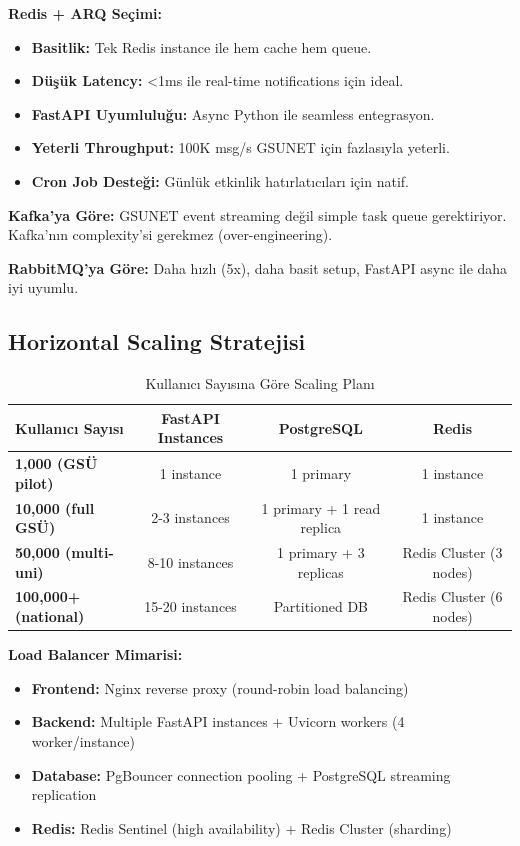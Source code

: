 \documentclass[a4paper,12pt]{report}
\begin{document}
\textbf{Redis + ARQ Seçimi:}

\begin{itemize}
    \item \textbf{Basitlik:} Tek Redis instance ile hem cache hem queue.
    \item \textbf{Düşük Latency:} <1ms ile real-time notifications için ideal.
    \item \textbf{FastAPI Uyumluluğu:} Async Python ile seamless entegrasyon.
    \item \textbf{Yeterli Throughput:} 100K msg/s GSUNET için fazlasıyla yeterli.
    \item \textbf{Cron Job Desteği:} Günlük etkinlik hatırlatıcıları için natif.
\end{itemize}

\textbf{Kafka'ya Göre:} GSUNET event streaming değil simple task queue gerektiriyor. Kafka'nın complexity'si gerekmez (over-engineering).

\textbf{RabbitMQ'ya Göre:} Daha hızlı (5x), daha basit setup, FastAPI async ile daha iyi uyumlu.

\subsection{Horizontal Scaling Stratejisi}

\begin{table}[h]
\centering
\small
\begin{tabular}{|l|c|c|c|}
\hline
\textbf{Kullanıcı Sayısı} & \textbf{FastAPI Instances} & \textbf{PostgreSQL} & \textbf{Redis} \\ \hline
\textbf{1,000 (GSÜ pilot)} & 1 instance & 1 primary & 1 instance \\ \hline
\textbf{10,000 (full GSÜ)} & 2-3 instances & 1 primary + 1 read replica & 1 instance \\ \hline
\textbf{50,000 (multi-uni)} & 8-10 instances & 1 primary + 3 replicas & Redis Cluster (3 nodes) \\ \hline
\textbf{100,000+ (national)} & 15-20 instances & Partitioned DB & Redis Cluster (6 nodes) \\ \hline
\end{tabular}
\caption{Kullanıcı Sayısına Göre Scaling Planı}
\end{table}

\textbf{Load Balancer Mimarisi:}

\begin{itemize}
    \item \textbf{Frontend:} Nginx reverse proxy (round-robin load balancing)
    \item \textbf{Backend:} Multiple FastAPI instances + Uvicorn workers (4 worker/instance)
    \item \textbf{Database:} PgBouncer connection pooling + PostgreSQL streaming replication
    \item \textbf{Redis:} Redis Sentinel (high availability) + Redis Cluster (sharding)
\end{itemize}
\end{document}
